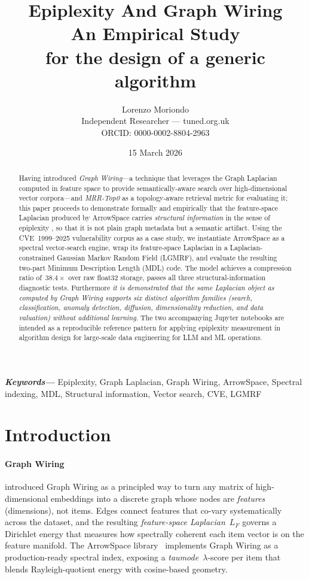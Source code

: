 \documentclass[12pt,a4paper]{article}
\title{%
	\textbf{Epiplexity And Graph Wiring\\
		An Empirical Study\\ for the design of a generic algorithm}
}
\author{Lorenzo Moriondo\\
	\small Independent Researcher --- tuned.org.uk\\
	\small ORCID: 0000-0002-8804-2963}
\date{15 March 2026}
\providecommand{\keywords}[1]{\textbf{\textit{Keywords---}} #1}
\theoremstyle{plain}
\theoremstyle{definition}
\theoremstyle{remark}
\newcommand{\1}{\mathbf{1}}
\begin{document}
	\maketitle
	
	\begin{abstract}
		Having introduced \emph{Graph Wiring}---a technique that leverages the
		Graph Laplacian computed in feature space to provide semantically-aware
		search over high-dimensional vector corpora---and \emph{MRR-Top0} as a
		topology-aware retrieval metric for evaluating it; this paper proceeds
		to demonstrate formally and empirically that the feature-space Laplacian
		produced by ArrowSpace carries \emph{structural information} in the sense
		of epiplexity \citep{finzi2026epiplexity}, so that it is not plain graph
		metadata but a semantic artifact.
		Using the CVE~1999--2025 vulnerability corpus as a case study, we
		instantiate ArrowSpace as a spectral vector-search engine, wrap its
		feature-space Laplacian in a Laplacian-constrained Gaussian Markov
		Random Field (LGMRF), and evaluate the resulting two-part Minimum
		Description Length (MDL) code.
		The model achieves a compression ratio of~$38.4\times$ over raw float32
		storage, passes all three structural-information diagnostic tests. Furthermore
		\emph{it is demonstrated that the same Laplacian object as computed by Graph Wiring supports six distinct algorithm families
		(search, classification, anomaly detection, diffusion, dimensionality
		reduction, and data valuation) without additional learning}.
		The two accompanying Jupyter notebooks are intended as a reproducible
		reference pattern for applying epiplexity measurement in algorithm design
		for large-scale data engineering for LLM and ML operations.
	\end{abstract}
	
	\keywords{Epiplexity, Graph Laplacian, Graph Wiring, ArrowSpace,
		Spectral indexing, MDL, Structural information, Vector search,
		CVE, LGMRF}
	
	\section{Introduction}
	\label{sec:intro}
	
	\paragraph{Graph Wiring}
	\cite{graphwiring2025} introduced Graph Wiring as a principled way to
	turn any matrix of high-dimensional embeddings into a discrete graph
	whose nodes are \emph{features} (dimensions), not items.
	Edges connect features that co-vary systematically across the dataset,
	and the resulting \emph{feature-space Laplacian}~$L_F$ governs a
	Dirichlet energy that measures how spectrally coherent each item vector
	is on the feature manifold.
	The ArrowSpace library~\citep{Moriondo2025ArrowSpace} implements Graph
	Wiring as a production-ready spectral index, exposing a
	\emph{taumode}~$\lambda$-score per item that blends Rayleigh-quotient
	energy with cosine-based geometry.
	
\end{document}
